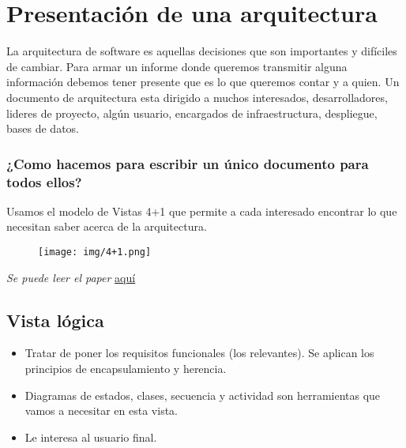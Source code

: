 

\section{Presentación de una arquitectura}
La arquitectura de software es aquellas decisiones que son importantes y difíciles de cambiar.
Para armar un informe donde queremos transmitir alguna información debemos tener presente que es lo que queremos contar y a quien.
Un documento de arquitectura esta dirigido a muchos interesados, desarrolladores, lideres de proyecto, algún usuario, encargados de infraestructura, despliegue, bases de datos.

\subsubsection*{¿Como hacemos para escribir un único documento para todos ellos?}
Usamos el modelo de Vistas 4+1 que permite a cada interesado encontrar lo que necesitan saber acerca de la arquitectura.

\begin{figure}[!htb]
    \centering
    \texttt{[image: img/4+1.png]}
\end{figure}

\textit{Se puede leer el paper }\href{https://www.cs.ubc.ca/~gregor/teaching/papers/4+1view-architecture.pdf}{aquí}

\subsection*{Vista lógica}
\begin{itemize}
\item Tratar de poner los requisitos funcionales (los relevantes). Se aplican los principios de encapsulamiento y herencia.
\item Diagramas de estados, clases, secuencia y actividad son herramientas que vamos a necesitar en esta vista.
\item Le interesa al usuario final.
\end{itemize}


